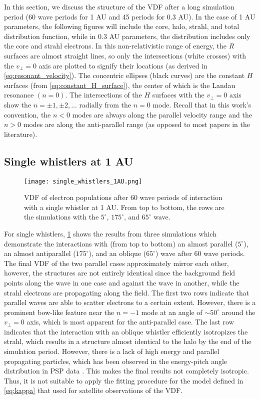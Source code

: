 
In this section, we discuss the structure of the VDF after a long simulation
period (60 wave periods for 1 AU and 45 periods for 0.3 AU). In the case of 1 AU
parameters, the following figures will include the core, halo, strahl, and 
total distribution function, while in 0.3 AU parameters, the distribution 
includes only the core and strahl electrons. In this non-relativistic range of 
energy, the $R$ surfaces are almost straight lines, so only the 
intersections (white crosses) with the $v_\perp=0$ axis are plotted to signify 
their locations (as derived in
\cref{eq:resonant_velocity}). The concentric ellipses (black curves) are the
constant $H$ surfaces (from \cref{eq:constant_H_surface}), the center of which is the Landau resonance $(n=0)$. The intersections of the $H$ surfaces with the
$v_\perp=0$ axis show the $n=\pm1,\pm2,...$ radially from the $n=0$ mode. Recall
that in this work's convention, the $n<0$ modes are always along the parallel 
velocity range and the $n>0$ modes are along the anti-parallel range (as 
opposed to most papers in the literature).

\subsection{Single whistlers at 1 AU}
\begin{figure}
    \centering
    \texttt{[image: single\_whistlers\_1AU.png]}
    \caption{VDF of electron populations after 60 wave periods of interaction
    with a single whistler at 1 AU. From top to bottom, the rows are the
simulations with the $5^\circ$, $175^\circ$, and $65^\circ$ wave.}
    \label{fig:single_whistlers_1AU}
\end{figure}

For single whistlers, \cref{fig:single_whistlers_1AU} shows the results from 
three simulations which demonstrate the interactions with (from
top to bottom) an almost parallel ($5^\circ$), an almost antiparallel
($175^\circ$), and an oblique ($65^\circ$) wave after 60 wave periods. The
final VDF of the two parallel cases approximately mirror each other, however,
the structures are not entirely identical since the background field points
along the wave in one case and against the wave in another, while the strahl
electrons are propagating along the field. The first two rows
indicate that parallel waves are able to scatter electrons to a certain extent.
However, there is a prominent bow-like feature near the $n=-1$ mode at an angle
of $\sim50^\circ$ around the $v_\perp=0$ axis, which is most apparent for the
anti-parallel case. The last row indicates that the interaction with an oblique
whistler efficiently isotropizes the strahl, which results in a structure
almost identical to the halo by the end of the simulation period. However, there
is a lack of high energy and parallel propagating particles, which has been
observed in the energy-pitch angle distribution in PSP data
\citep{Cattell2021b}. This makes the final results not completely isotropic.
Thus, it is not suitable to apply the fitting procedure for the model
defined in \cref{eq:kappa} that \cite{Wilson2019} used for satellite observations of the VDF.

